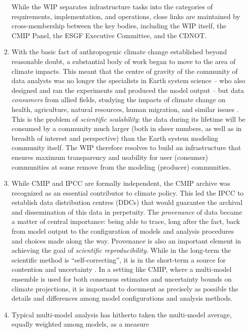 \documentclass[gmd,manuscript]{copernicus}
\newcommand{\pipref}[1] {\citep{ref:#1}}
\begin{document}
\begin{enumerate}
  While the WIP separates infrastructure tasks into the categories of
  requirements, implementation, and operations, close links are
  maintained by cross-membership between the key bodies, including the
  WIP itself, the CMIP Panel, the ESGF Executive Committee, and the
  CDNOT.
\item\label{broad} With the basic fact of anthropogenic climate change
  established beyond reasonable doubt, a substantial body of work
  began to move to the area of climate impacts. This meant that the
  centre of gravity of the community of data analysts was no longer
  the specialists in Earth system science -- who also designed and ran
  the experiments and produced the model output -- but data
  \emph{consumers} from allied fields, studying the impacts of climate
  change on health, agriculture, natural resources, human migration,
  and similar issues \pipref{mossetal2010}. This is the problem of
  \emph{scientific scalability}: the data during its lifetime will be
  consumed by a community much larger (both in sheer numbers, as well
  as in breadth of interest and perspective) than the Earth
  system modeling community itself. The WIP therefore resolves
  to build an infrastructure that ensures maximum transparency and
  usability for user (consumer) communities at some remove from the
  modeling (producer) communities.
\item\label{repro} While CMIP and IPCC are formally independent, the
  CMIP archive was recognized as an essential contributor to climate
  policy. This led the IPCC to establish data distribution centres
  (DDCs) that would guarantee the archival and dissemination of this
  data in perpetuity. The \emph{provenance} of data became a matter of
  central importance: being able to trace, long after the fact, back
  from model output to the configuration of models and analysis
  procedures and choices made along the way. Provenance is also an
  important element in achieving the goal of \emph{scientific
    reproducibility}. While in the long-term the scientific method is
  ``self-correcting'', it is in the short-term a source for contention
  and uncertainty \pipref{collinstabak2014}. In a setting like CMIP,
  where a multi-model ensemble is used for both consensus estimates
  and uncertainty bounds on climate projections, it is important to
  document as precisely as possible the details and differences among
  model configurations and analysis methods.
\item\label{analysis} Typical multi-model analysis has hitherto taken
  the multi-model average, equally weighted among models, as a measure

\end{enumerate}
\end{document}
